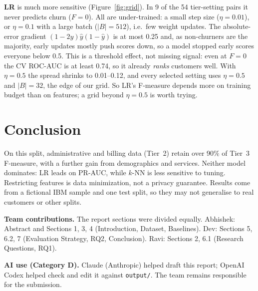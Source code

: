\documentclass[sigconf,nonacm]{acmart}
\begin{document}
\textbf{LR} is much more sensitive (Figure~\ref{fig:grid}). In 9 of the 54 tier-setting pairs it never predicts churn ($F=0$). All are under-trained: a small step size ($\eta=0.01$), or $\eta=0.1$ with a large batch ($|B|=512$), i.e.\ few weight updates. The absolute-error gradient $(1-2y)\hat y(1-\hat y)$ is at most 0.25 and, as non-churners are the majority, early updates mostly push scores down, so a model stopped early scores everyone below 0.5. This is a threshold effect, not missing signal: even at $F=0$ the CV ROC-AUC is at least 0.74, so it already \emph{ranks} customers well. With $\eta=0.5$ the spread shrinks to 0.01--0.12, and every selected setting uses $\eta=0.5$ and $|B|=32$, the edge of our grid. So LR's F-measure depends more on training budget than on features; a grid beyond $\eta=0.5$ is worth trying.

\section{Conclusion}
On this split, administrative and billing data (Tier~2) retain over 90\% of Tier~3 F-measure, with a further gain from demographics and services. Neither model dominates: LR leads on PR-AUC, while $k$-NN is less sensitive to tuning. Restricting features is data minimization, not a privacy guarantee. Results come from a fictional IBM sample and one test split, so they may not generalise to real customers or other splits.

\textbf{Team contributions.} The report sections were divided equally. Abhishek: Abstract and Sections 1, 3, 4 (Introduction, Dataset, Baselines). Dev: Sections 5, 6.2, 7 (Evaluation Strategy, RQ2, Conclusion). Ravi: Sections 2, 6.1 (Research Questions, RQ1).

\textbf{AI use (Category D).} Claude (Anthropic) helped draft this report; OpenAI Codex helped check and edit it against \texttt{output/}. The team remains responsible for the submission.



\end{document}
